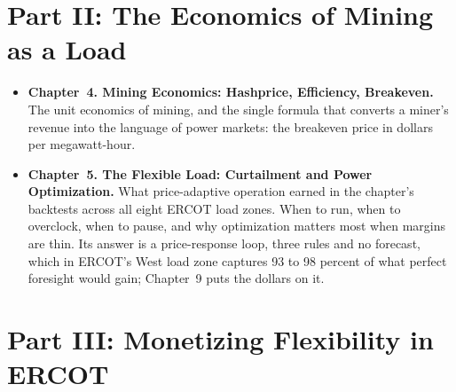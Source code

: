 \section*{Part II: The Economics of Mining as a Load}

\begin{itemize}
\item \textbf{Chapter~4. Mining Economics: Hashprice, Efficiency,
Breakeven.} The unit economics of mining, and the single formula
that converts a miner's revenue into the language of power markets:
the breakeven price in dollars per megawatt-hour.

\item \textbf{Chapter~5. The Flexible Load: Curtailment and Power
Optimization.} What price-adaptive operation earned in the chapter's backtests across all eight ERCOT load zones. When to run, when to overclock,
when to pause, and why optimization matters most when margins are thin.
Its answer is a price-response loop, three rules and no forecast, which in ERCOT's West load zone captures 93 to 98
percent of what perfect foresight would gain; Chapter~9 puts the dollars on it.
\end{itemize}

\section*{Part III: Monetizing Flexibility in ERCOT}


